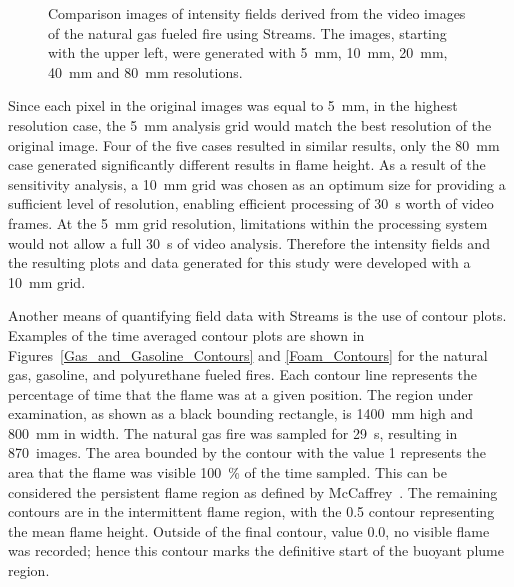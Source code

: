 \documentclass[twoside]{uocthesis}
\begin{document}
{\begin{figure}[p]
	 \caption[Comparison images of intensity fields derived from the video images of the natural gas fueled fire]{Comparison images of intensity fields derived from the video images of the natural gas fueled fire using Streams. The images, starting with the upper left, were generated with 5~mm, 10~mm, 20~mm, 40~mm and 80~mm resolutions.}
	 \label{Intensity}
\end{figure}

Since each pixel in the original images was equal to 5~mm, in the highest resolution case, the 5~mm analysis grid would match the best resolution of the original image.  Four of the five cases resulted in similar results, only the 80~mm case generated significantly different results in flame height.  As a result of the sensitivity analysis, a 10~mm grid was chosen as an optimum size for providing a sufficient level of resolution, enabling efficient processing of 30~s worth of video frames.  At the 5~mm grid resolution, limitations within the processing system would not allow a full 30~s of video analysis.  Therefore the intensity fields and the resulting plots and data generated for this study were developed with a 10~mm grid.

Another means of quantifying field data with Streams is the use of contour plots.  Examples of the time averaged contour plots are shown in Figures~\ref{Gas_and_Gasoline_Contours} and \ref{Foam_Contours} for the natural gas, gasoline, and polyurethane fueled fires.  Each contour line represents the percentage of time that the flame was at a given position. The region under examination, as shown as a black bounding rectangle, is 1400~mm high and 800~mm in width.  The natural gas fire was sampled for 29~s, resulting in 870~images. The area bounded by the contour with the value 1 represents the area that the flame was visible 100~\% of the time sampled. This can be considered the persistent flame region as defined by McCaffrey~\cite{McCaffrey:1979}. The remaining contours are in the intermittent flame region, with the 0.5 contour representing the mean flame height. Outside of the final contour, value 0.0, no visible flame was recorded; hence this contour marks the definitive start of the buoyant plume region.

}
\end{document}
